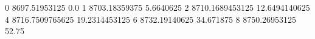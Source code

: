 0 8697.51953125 0.0
1 8703.18359375 5.6640625
2 8710.1689453125 12.6494140625
4 8716.7509765625 19.2314453125
6 8732.19140625 34.671875
8 8750.26953125 52.75
